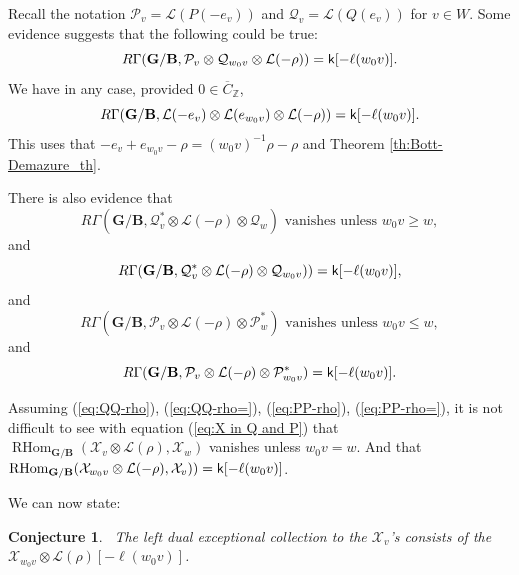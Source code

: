 \documentclass[sn-mathphys-num]{sn-jnl}%
\newcommand\tP{{\mathcal P}}
\newcommand\tQ{{\mathcal Q}}
\newcommand{\tX}{{\mathcal X}}
\newcommand{\Ll}{\mathcal L}
\newcommand*{\RHom}{\mathop{\mathrm {RHom}}\nolimits}
\newcommand{\bg}{\mathbf G}
\newcommand{\fb}{\mathbf B}
\newtheorem{conjecture}[theorem]{Conjecture}
\theoremstyle{definition}
\begin{document}
Recall the notation $\tP_v=\Ll(P(-e_v))$ and $\tQ_v=\Ll(Q(e_v))$ for $v\in W$.
Some evidence suggests that the following could be true:
\begin{equation}\label{eq:indPQ-rho} R\Gamma (\bg/\fb,\tP_v\otimes \tQ_{w_0v}\otimes \Ll (-\rho))= {\sf k}[-\ell(w_0v)].
\end{equation}
We have in any case, provided $0\in\overline C _{\mathbb Z}$,
\begin{equation}\label{eq:indStSt-rho}
 R\Gamma (\bg/\fb,\Ll(-e_v)\otimes \Ll(e_{w_0v})\otimes \Ll (-\rho))= {\sf k}[-\ell(w_0v)] .
\end{equation}
This uses that 
$-e_v+e_{w_0v}-\rho=(w_0v)^{-1}\rho-\rho$ and Theorem \ref{th:Bott-Demazure_th}.

There is also evidence that 
\begin{equation}\label{eq:QQ-rho}R\Gamma ({\bg/\fb},\tQ_v^{\ast}\otimes \Ll (-\rho)\otimes \tQ_w) \mbox{ vanishes unless } w_0 v \geq w,\end{equation}
and 
\begin{equation}\label{eq:QQ-rho=}R\Gamma ({\bg/\fb},\tQ_v^{\ast}\otimes \Ll (-\rho)\otimes \tQ_{w_0 v}))={\sf k}[-\ell(w_0 v)],
\end{equation}
and\begin{equation}\label{eq:PP-rho} R\Gamma ({\bg/\fb}, \tP_v\otimes \Ll (-\rho)\otimes \tP_w^{\ast}) \mbox{ vanishes unless } w_0 v \leq w,\end{equation}
and\begin{equation}\label{eq:PP-rho=} R\Gamma ({\bg/\fb}, \tP_v\otimes \Ll (-\rho)\otimes \tP_{w_0 v}^{\ast})={\sf k}[-\ell(w_0 v)].\end{equation}

Assuming (\ref{eq:QQ-rho}), (\ref{eq:QQ-rho=}), (\ref{eq:PP-rho}), (\ref{eq:PP-rho=}), it is not difficult to see with equation (\ref{eq:X in Q and P}) that 
$\RHom_{\bg/\fb}(\tX_v\otimes \Ll (\rho), \tX_w)$ vanishes unless $w_0 v = w$.
And that $\RHom_{\bg/\fb}(\tX_{w_0 v}\otimes \Ll (-\rho),\tX_{v}))={\sf k}[-\ell(w_0v)]$.

We can now state:

\begin{conjecture}\
The left dual exceptional collection to the $\tX_v$'s consists of the $\tX_{w_0v}\otimes\Ll(\rho)[-\ell(w_0v)]$.
\end{conjecture}
\end{document}
